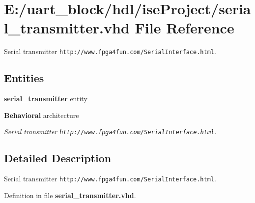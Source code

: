 \section{E\-:/uart\-\_\-block/hdl/ise\-Project/serial\-\_\-transmitter.vhd File Reference}
\label{serial__transmitter_8vhd}


Serial transmitter {\tt http\-://www.\-fpga4fun.\-com/\-Serial\-Interface.\-html}.  


\subsection*{Entities}
\begin{DoxyCompactItemize}
\item 
{\bf serial\-\_\-transmitter} entity
\item 
{\bf Behavioral} architecture
\begin{DoxyCompactList}\small\item\em Serial transmitter {\tt http\-://www.\-fpga4fun.\-com/\-Serial\-Interface.\-html}. \end{DoxyCompactList}\end{DoxyCompactItemize}


\subsection{Detailed Description}
Serial transmitter {\tt http\-://www.\-fpga4fun.\-com/\-Serial\-Interface.\-html}. 

Definition in file {\bf serial\-\_\-transmitter.\-vhd}.

